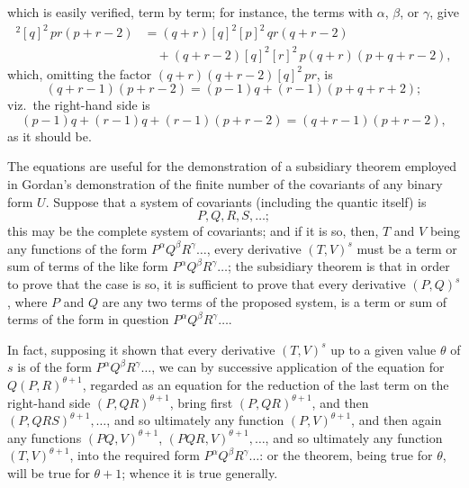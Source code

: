 \documentclass[11pt,a4paper]{article}
\begin{document}
\noindent which is easily verified, term by term; for instance, the terms with $\alpha$, $\beta$, or $\gamma$, give
\begin{align*}
[q + r]^{2}[q]^{2}\,pr(p + r - 2) &= (q + r)[q]^{2}[p]^{2}\,qr(q + r - 2)\\
&\quad + (q + r - 2)[q]^{2}[r]^{2}\,p(q + r)(p + q + r - 2),
\end{align*}
which, omitting the factor $(q + r)(q + r - 2)[q]^{2}\,pr$, is
\[
(q + r - 1)(p + r - 2) = (p - 1)q + (r - 1)(p + q + r + 2);
\]
viz.\ the right-hand side is
\[
(p - 1)q + (r - 1)q + (r - 1)(p + r - 2) = (q + r - 1)(p + r - 2),
\]
as it should be.

\medskip

The equations are useful for the demonstration of a subsidiary theorem employed in Gordan's demonstration of the finite number of the covariants of any binary form $U$. Suppose that a system of covariants (including the quantic itself) is
\[
P, Q, R, S, \ldots;
\]
this may be the complete system of covariants; and if it is so, then, $T$ and $V$ being any functions of the form $P^{\alpha}Q^{\beta}R^{\gamma}\ldots$, every derivative $(T, V)^{s}$ must be a term or sum of terms of the like form $P^{\alpha}Q^{\beta}R^{\gamma}\ldots$; the subsidiary theorem is that in order to prove that the case is so, it is sufficient to prove that every derivative $(P, Q)^{s}$, where $P$ and $Q$ are any two terms of the proposed system, is a term or sum of terms of the form in question $P^{\alpha}Q^{\beta}R^{\gamma}\ldots$.

\medskip

In fact, supposing it shown that every derivative $(T, V)^{s}$ up to a given value $\theta$ of $s$ is of the form $P^{\alpha}Q^{\beta}R^{\gamma}\ldots$, we can by successive application of the equation for $Q(P, R)^{\theta+1}$, regarded as an equation for the reduction of the last term on the right-hand side $(P, QR)^{\theta+1}$, bring first $(P, QR)^{\theta+1}$, and then $(P, QRS)^{\theta+1}, \ldots$, and so ultimately any function $(P, V)^{\theta+1}$, and then again any functions $(PQ, V)^{\theta+1}$, $(PQR, V)^{\theta+1}, \ldots$, and so ultimately any function $(T, V)^{\theta+1}$, into the required form $P^{\alpha}Q^{\beta}R^{\gamma}\ldots$: or the theorem, being true for $\theta$, will be true for $\theta + 1$; whence it is true generally.

\newpage

\end{document}
